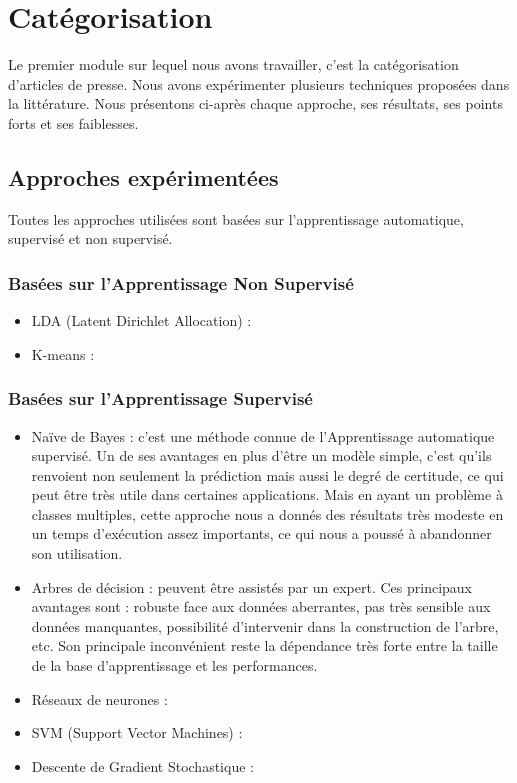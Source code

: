 \section{Catégorisation}
    Le premier module sur lequel nous avons travailler, c'est la catégorisation d'articles de presse. Nous avons expérimenter plusieurs techniques proposées dans la littérature. Nous présentons ci-après chaque approche, ses résultats, ses points forts et ses faiblesses.
    \subsection{Approches expérimentées\label{approches}}
        Toutes les approches utilisées sont basées sur l'apprentissage automatique, supervisé et non supervisé. 
        \subsubsection{Basées sur l'Apprentissage Non Supervisé}
            \begin{itemize}
                \item{LDA (Latent Dirichlet Allocation) : }
                \item{K-means : }
            \end{itemize}

        \subsubsection{Basées sur l'Apprentissage Supervisé}
            \begin{itemize}
                \item{Naïve de Bayes : }
                c'est une méthode connue de l'Apprentissage automatique supervisé. Un de ses avantages en plus d'être un modèle simple, c'est qu'ils renvoient non seulement la prédiction mais aussi le degré de certitude, ce qui peut être très utile dans certaines applications. Mais en ayant un problème à classes multiples, cette approche nous a donnés des résultats très modeste en un temps d'exécution assez importants, ce qui nous a poussé à abandonner son utilisation.\\

                \item{Arbres de décision : }
                peuvent être assistés par un expert. Ces principaux avantages sont : robuste face aux données aberrantes, pas très sensible aux données manquantes, possibilité d’intervenir dans la construction de l’arbre, etc. Son principale inconvénient reste la dépendance très forte entre la taille de la base d’apprentissage et les performances.\\

                \item{Réseaux de neurones : }
                \item{SVM (Support Vector Machines) : }
                \item{Descente de Gradient Stochastique : }
            \end{itemize}
                
